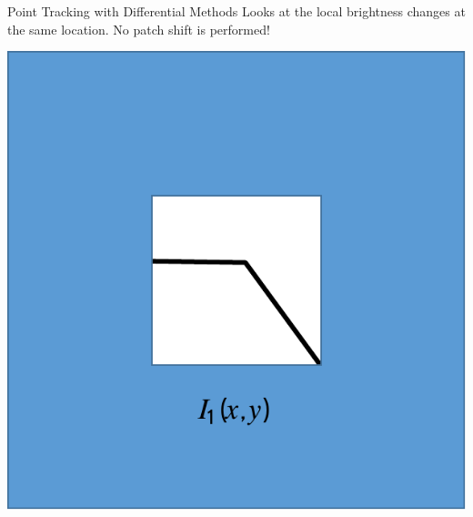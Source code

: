\begin{frame}{Point Tracking with Differential Methods}
  Looks at the local brightness changes at the same location. No patch shift is performed!
  
  \begin{center}
    \includegraphics[width=0.3\columnwidth]{./images/optical_flow/point_tracking_differential_methods_3.pdf}
  \end{center}
\end{frame}

